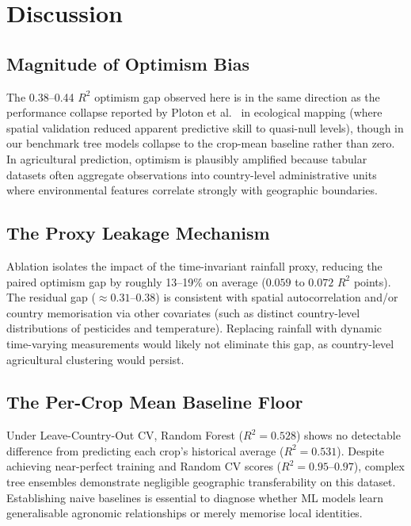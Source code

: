 \documentclass[conference]{IEEEtran}
\begin{document}
\section{Discussion}
\label{sec:discussion}

\subsection{Magnitude of Optimism Bias}

The 0.38--0.44 $R^2$ optimism gap observed here is in the same direction as the 
performance collapse reported by Ploton et al.~\cite{ploton2020} in ecological 
mapping (where spatial validation reduced apparent predictive skill to quasi-null 
levels), though in our benchmark tree models collapse to the crop-mean baseline 
rather than zero. In agricultural prediction, optimism is plausibly amplified 
because tabular datasets often aggregate observations into country-level administrative 
units where environmental features correlate strongly with geographic boundaries.

\subsection{The Proxy Leakage Mechanism}

Ablation isolates the impact of the time-invariant rainfall proxy, reducing the 
paired optimism gap by roughly 13--19\% on average ($0.059$ to $0.072$ $R^2$ points). 
The residual gap (${\approx}0.31$--$0.38$) is consistent with spatial 
autocorrelation and/or country memorisation via other covariates (such as 
distinct country-level distributions of pesticides and temperature). Replacing 
rainfall with dynamic time-varying measurements would likely not eliminate this 
gap, as country-level agricultural clustering would persist.

\subsection{The Per-Crop Mean Baseline Floor}

Under Leave-Country-Out CV, Random Forest ($R^2 = 0.528$) shows no detectable 
difference from predicting each crop's historical average ($R^2 = 0.531$). Despite 
achieving near-perfect training and Random CV scores ($R^2 = 0.95$--$0.97$), complex 
tree ensembles demonstrate negligible geographic transferability on this dataset. 
Establishing naive baselines is essential to diagnose whether ML models learn 
generalisable agronomic relationships or merely memorise local identities.
\end{document}
